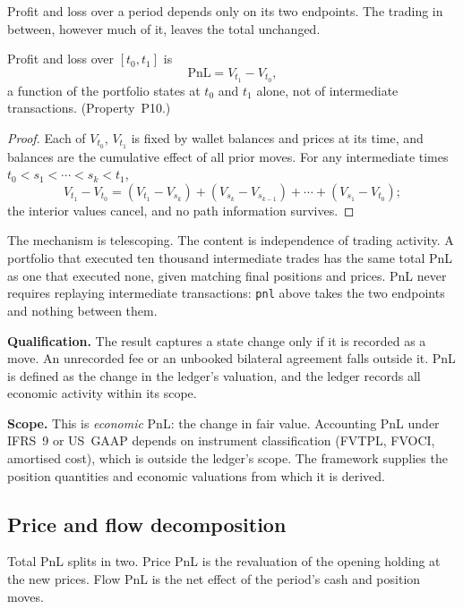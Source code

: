 \noindent Profit and loss over a period depends only on its two endpoints. The trading in between, however much of it, leaves the total unchanged.

\begin{theorem}
\label{inv:P10}
Profit and loss over $[t_0, t_1]$ is
\[
\mathrm{PnL} = V_{t_1} - V_{t_0},
\]
a function of the portfolio states at $t_0$ and $t_1$ alone, not of intermediate transactions. (Property~P10.)
\end{theorem}

\begin{proof}
Each of $V_{t_0}$, $V_{t_1}$ is fixed by wallet balances and prices at its time, and balances are the cumulative effect of all prior moves. For any intermediate times $t_0 < s_1 < \cdots < s_k < t_1$,
\[
V_{t_1} - V_{t_0} = (V_{t_1} - V_{s_k}) + (V_{s_k} - V_{s_{k-1}}) + \cdots + (V_{s_1} - V_{t_0});
\]
the interior values cancel, and no path information survives.
\end{proof}

\noindent The mechanism is telescoping. The content is independence of trading activity. A portfolio that executed ten thousand intermediate trades has the same total PnL as one that executed none, given matching final positions and prices. PnL never requires replaying intermediate transactions: \texttt{pnl} above takes the two endpoints and nothing between them.

\medskip
\noindent\textbf{Qualification.} The result captures a state change only if it is recorded as a move. An unrecorded fee or an unbooked bilateral agreement falls outside it. PnL is defined as the change in the ledger's valuation, and the ledger records all economic activity within its scope.

\medskip
\noindent\textbf{Scope.} This is \emph{economic} PnL: the change in fair value. Accounting PnL under IFRS~9 or US~GAAP depends on instrument classification (FVTPL, FVOCI, amortised cost), which is outside the ledger's scope. The framework supplies the position quantities and economic valuations from which it is derived.

\subsection{Price and flow decomposition}

\noindent Total PnL splits in two. Price PnL is the revaluation of the opening holding at the new prices. Flow PnL is the net effect of the period's cash and position moves.

